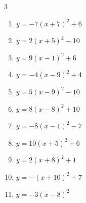 \begin{multicols}{3}
\begin{enumerate}
        \phantom{$\displaystyle 頂点\left( -2 , 8 \right)$}

  \item $\displaystyle y=-7\left( x+7\right)^{2}+6$

        \phantom{$\displaystyle 頂点\left( -7 , 6 \right)$}

  \item $\displaystyle y=2\left( x+5\right)^{2}-10$

        \phantom{$\displaystyle 頂点\left( -5 , -10 \right)$}

  \item $\displaystyle y=9\left( x-1\right)^{2}+6$

        \phantom{$\displaystyle 頂点\left( 1 , 6 \right)$}

  \item $\displaystyle y=-4\left( x-9\right)^{2}+4$

        \phantom{$\displaystyle 頂点\left( 9 , 4 \right)$}

  \item $\displaystyle y=5\left( x-9\right)^{2}-10$

        \phantom{$\displaystyle 頂点\left( 9 , -10 \right)$}

  \item $\displaystyle y=8\left( x-8\right)^{2}+10$

        \phantom{$\displaystyle 頂点\left( 8 , 10 \right)$}

  \item $\displaystyle y=-8\left( x-1\right)^{2}-7$

        \phantom{$\displaystyle 頂点\left( 1 , -7 \right)$}

  \item $\displaystyle y=10\left( x+5\right)^{2}+6$

        \phantom{$\displaystyle 頂点\left( -5 , 6 \right)$}

  \item $\displaystyle y=2\left( x+8\right)^{2}+1$

        \phantom{$\displaystyle 頂点\left( -8 , 1 \right)$}

  \item $\displaystyle y=-\left( x+10\right)^{2}+7$

        \phantom{$\displaystyle 頂点\left( -10 , 7 \right)$}

  \item $\displaystyle y=-3\left( x-8\right)^{2}$

        \phantom{$\displaystyle 頂点\left( 8 , 0 \right)$}


\end{enumerate}
\end{multicols}
